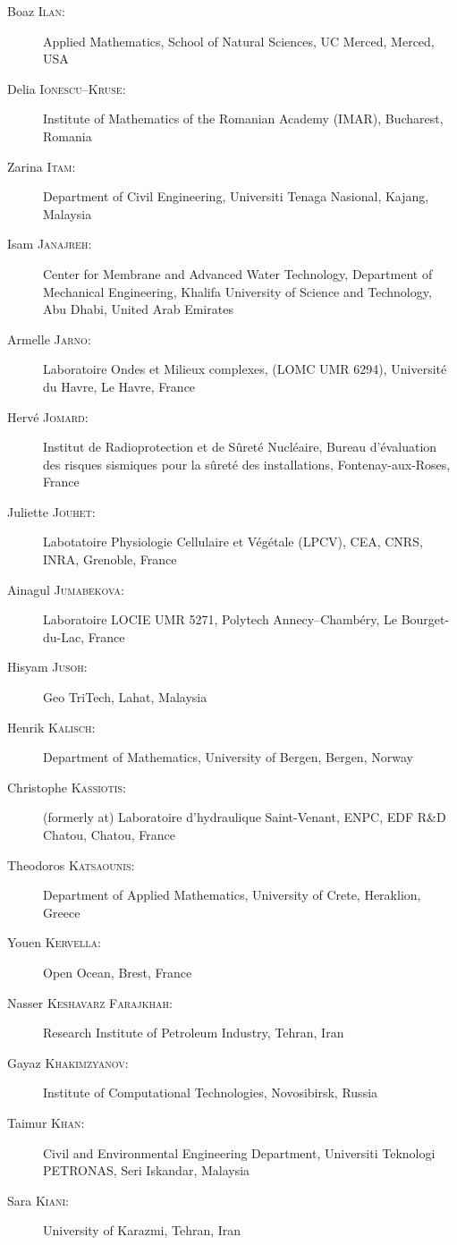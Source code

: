 \documentclass[final, a4paper, oneside, 12pt]{article}
\numberwithin{equation}{section}
\begin{document}
\begin{description}
  \item[Boaz \textsc{Ilan}:] Applied Mathematics, School of Natural Sciences, UC Merced, Merced, USA
  \item[Delia \textsc{Ionescu--Kruse}:] Institute of Mathematics of the Romanian Academy (IMAR), Bucharest, Romania
  \item[Zarina \textsc{Itam}:] Department of Civil Engineering, Universiti Tenaga Nasional, Kajang, Malaysia
  \item[Isam \textsc{Janajreh}:] Center for Membrane and Advanced Water Technology, Department of Mechanical Engineering, Khalifa University of Science and Technology, Abu Dhabi, United Arab Emirates
  \item[Armelle \textsc{Jarno}:] Laboratoire Ondes et Milieux complexes, (LOMC UMR 6294), Universit\'e du Havre, Le Havre, France
  \item[Herv\'e \textsc{Jomard}:] Institut de Radioprotection et de S\^uret\'e Nucl\'eaire, Bureau d'\'evaluation des risques sismiques pour la s\^uret\'e des installations, Fontenay-aux-Roses, France
  \item[Juliette \textsc{Jouhet}:] Labotatoire Physiologie Cellulaire et V\'eg\'etale (LPCV), CEA, CNRS, INRA, Grenoble, France
  \item[Ainagul \textsc{Jumabekova}:] Laboratoire LOCIE UMR 5271, Polytech Annecy--Chamb\'ery, Le Bourget-du-Lac, France
  \item[Hisyam \textsc{Jusoh}:] Geo TriTech, Lahat, Malaysia
  \item[Henrik \textsc{Kalisch}:] Department of Mathematics, University of Bergen, Bergen, Norway
  \item[Christophe \textsc{Kassiotis}:] (formerly at) Laboratoire d'hydraulique Saint-Venant, ENPC, EDF R\&D Chatou, Chatou, France
  \item[Theodoros \textsc{Katsaounis}:] Department of Applied Mathematics, University of Crete, Heraklion, Greece
  \item[Youen \textsc{Kervella}:] Open Ocean, Brest, France
  \item[Nasser \textsc{Keshavarz Farajkhah}:] Research Institute of Petroleum Industry, Tehran, Iran
  \item[Gayaz \textsc{Khakimzyanov}:] Institute of Computational Technologies, Novosibirsk, Russia
  \item[Taimur \textsc{Khan}:] Civil and Environmental Engineering Department, Universiti Teknologi PETRONAS, Seri Iskandar, Malaysia
  \item[Sara \textsc{Kiani}:] University of Karazmi, Tehran, Iran

\end{description}
\end{document}
